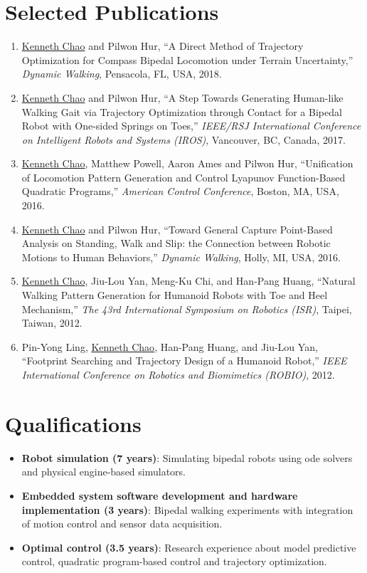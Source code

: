 \documentclass[letterpaper,11pt]{article}
\newcommand{\resumeItem}[2]{
  \item\small{
    \textbf{#1}{: #2 \vspace{-2pt}}
  }
}
\newcommand{\resumeNumItem}[1]{
  \item\small{
    {#1 \vspace{-2pt}}
  }
}
\newcommand{\resumeSubItem}[2]{\resumeItem{#1}{#2}\vspace{-4pt}}
\newcommand{\resumeSubHeadingListStart}{\begin{itemize}[leftmargin=*]}
\newcommand{\resumeSubHeadingListEnd}{\end{itemize}}
\newcommand{\resumeNumItemListStart}{\begin{enumerate}}
\newcommand{\resumeNumItemListEnd}{\end{enumerate}\vspace{-5pt}}
\begin{document}
\section{Selected Publications}
  \resumeNumItemListStart
  \resumeNumItem
  {\underline{Kenneth Chao} and Pilwon Hur,
  	``A Direct Method of Trajectory
  	Optimization for Compass Bipedal Locomotion under Terrain Uncertainty,''
  	\textit{Dynamic Walking},
  	Pensacola, FL, USA, 2018.}   
\resumeNumItem
{\underline{Kenneth Chao} and Pilwon Hur, ``A Step Towards Generating Human-like Walking Gait via Trajectory Optimization through Contact for a Bipedal Robot with One-sided Springs on Toes,''  \textit{IEEE/RSJ International Conference on Intelligent Robots and Systems (IROS)}, Vancouver, BC, Canada, 2017.}  
  
\resumeNumItem
{\underline{Kenneth Chao}, Matthew Powell, Aaron Ames and Pilwon Hur, ``Unification of Locomotion Pattern Generation and Control Lyapunov Function-Based Quadratic Programs,''
             	\textit{American Control Conference},
             	Boston, MA, USA, 2016.}
\resumeNumItem
{\underline{Kenneth Chao} and Pilwon Hur,
	``Toward General Capture Point-Based Analysis on Standing, Walk and Slip: the Connection between Robotic Motions to Human Behaviors,''
	\textit{Dynamic Walking},
	Holly, MI, USA, 2016.}    
\resumeNumItem
{\underline{Kenneth Chao}, Jiu-Lou Yan, Meng-Ku Chi, and Han-Pang Huang,
	``Natural Walking Pattern Generation for Humanoid Robots with Toe and Heel Mechanism,''
	\textit{The 43rd International Symposium on Robotics (ISR)},
	Taipei, Taiwan,
2012.}
\resumeNumItem
{Pin-Yong Ling, \underline{Kenneth Chao}, Han-Pang Huang, and Jiu-Lou Yan,
	``Footprint Searching and Trajectory Design of a Humanoid Robot,''
	\textit{IEEE International Conference on Robotics and Biomimetics (ROBIO)},
2012.}
    	
  \resumeNumItemListEnd
\section{Qualifications}

  \resumeSubHeadingListStart
    \resumeSubItem{Robot simulation (7 years)}
      {Simulating bipedal robots using ode solvers and physical engine-based simulators.}
    \resumeSubItem{Embedded system software development and hardware implementation (3 years)}
      { Bipedal walking experiments with integration of motion control and sensor data acquisition.}
    \resumeSubItem{Optimal control (3.5 years)}
      {Research experience about model predictive control, quadratic program-based control and trajectory optimization.}
  \resumeSubHeadingListEnd
    
\end{document}
